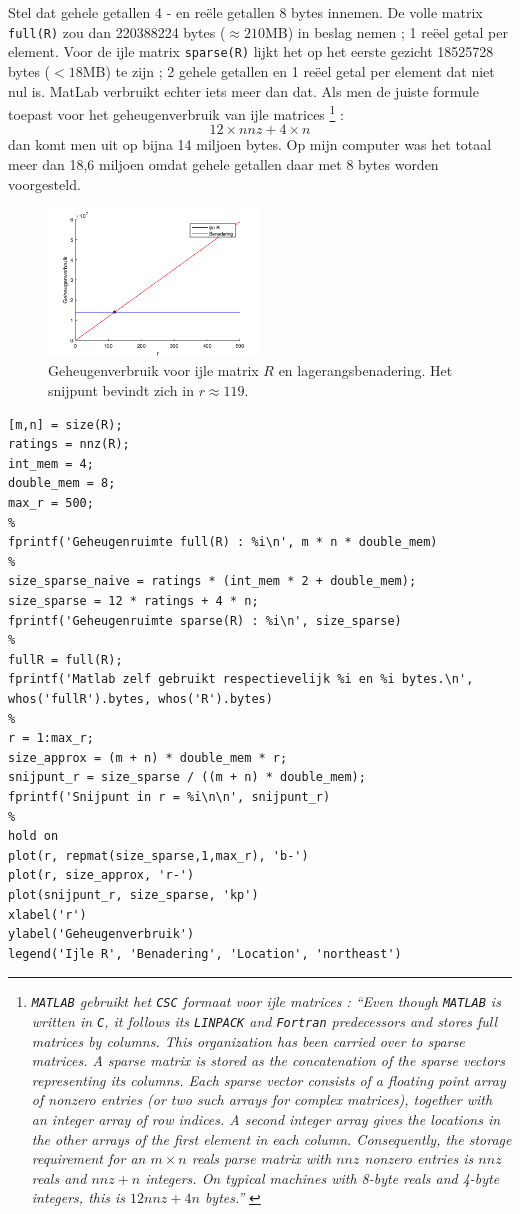 Stel dat gehele getallen 4 - en re\"ele getallen 8 bytes innemen. De volle matrix \texttt{full(R)} zou dan 220388224 bytes ($\approx 210$MB) in beslag nemen ; 1 re\"eel getal per element. Voor de ijle matrix \texttt{sparse(R)} lijkt het op het eerste gezicht 18525728 bytes ($< 18$MB) te zijn ; 2 gehele getallen en 1 re\"eel getal per element dat niet nul is. MatLab verbruikt echter iets meer dan dat. Als men de juiste formule toepast voor het geheugenverbruik van ijle matrices \footnote{\textit{\texttt{MATLAB} gebruikt het \texttt{CSC} formaat voor ijle matrices : ``Even though \texttt{MATLAB} is written in \texttt{C}, it follows its \texttt{LINPACK} and \texttt{Fortran} predecessors and stores full matrices by columns. This organization has been carried over to sparse matrices. A sparse matrix is stored as the concatenation of the sparse vectors representing its columns. Each sparse vector consists of a floating point array of nonzero entries (or two such arrays for complex matrices), together with an integer array of row indices. A second integer array gives the locations in the other arrays of the first element in each column. Consequently, the storage requirement for an $m\times n$ reals parse matrix with $nnz$ nonzero entries is $nnz$ reals and $nnz+n$ integers. On typical machines with 8-byte reals and 4-byte integers, this is $12nnz+4n$ bytes.''} \cite{Gilbert1992}} :
$$12\times nnz+4\times n$$
dan komt men uit op bijna 14 miljoen bytes. Op mijn computer was het totaal meer dan 18,6 miljoen omdat gehele getallen daar met 8 bytes worden voorgesteld.

\begin{figure}[h]
\centering
\includegraphics[width=0.5\textwidth]{res/op2.png}
\caption{Geheugenverbruik voor ijle matrix $R$ en lagerangsbenadering. Het snijpunt bevindt zich in $r\approx 119$.}
\label{fig:op2}
\end{figure}

\begin{lstlisting}
[m,n] = size(R);
ratings = nnz(R);
int_mem = 4;
double_mem = 8;
max_r = 500;
%
fprintf('Geheugenruimte full(R) : %i\n', m * n * double_mem)
%
size_sparse_naive = ratings * (int_mem * 2 + double_mem);
size_sparse = 12 * ratings + 4 * n;
fprintf('Geheugenruimte sparse(R) : %i\n', size_sparse)
%
fullR = full(R);
fprintf('Matlab zelf gebruikt respectievelijk %i en %i bytes.\n', whos('fullR').bytes, whos('R').bytes)
%
r = 1:max_r;
size_approx = (m + n) * double_mem * r;
snijpunt_r = size_sparse / ((m + n) * double_mem);
fprintf('Snijpunt in r = %i\n\n', snijpunt_r)
%
hold on
plot(r, repmat(size_sparse,1,max_r), 'b-')
plot(r, size_approx, 'r-')
plot(snijpunt_r, size_sparse, 'kp')
xlabel('r')
ylabel('Geheugenverbruik')
legend('Ijle R', 'Benadering', 'Location', 'northeast') 
\end{lstlisting}

